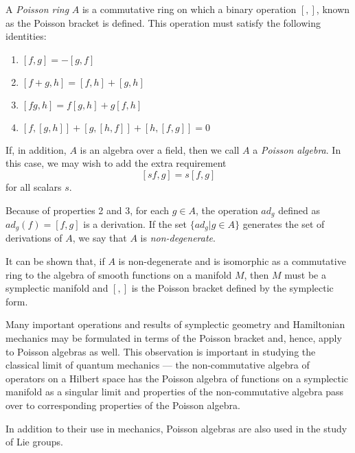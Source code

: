 \documentclass[12pt]{article}
\begin{document}
A \emph{Poisson ring} $A$ is a commutative ring on which a binary operation $[,]$, known as the Poisson bracket is defined.  This operation must satisfy the following identities:
\begin{enumerate}
\item $[f,g] = -[g,f]$
\item $[f + g, h] = [f,h] + [g,h]$
\item $[fg,h] = f[g,h] + g[f,h]$
\item $[f,[g,h]] + [g,[h,f]] + [h,[f,g]] = 0$
\end{enumerate}
If, in addition, $A$ is an algebra over a field, then we call $A$ a \emph{Poisson algebra}.  In this case, we may wish to add the extra requirement
 $$[sf,g] = s[f,g]$$
for all scalars $s$.

Because of properties 2 and 3, for each $g \in A$, the operation $ad_g$ defined as $ad_g(f) = [f,g]$ is a derivation.  If the set $\{ ad_g | g \in A \}$ generates the set of derivations of $A$, we say that  $A$ is \emph{non-degenerate}.

It can be shown that, if $A$ is non-degenerate and is isomorphic as a commutative ring to the algebra of smooth functions on a manifold $M$, then $M$ must be a symplectic manifold and $[,]$ is the Poisson bracket defined by the symplectic form.

Many important operations and results of symplectic geometry and Hamiltonian mechanics may be formulated in terms of the Poisson bracket and, hence, apply to Poisson algebras as well.  This observation is important in studying the classical limit of quantum mechanics --- the non-commutative algebra of operators on a Hilbert space has the Poisson algebra of functions on a symplectic manifold as a singular limit and properties of the non-commutative algebra pass over to corresponding properties of the Poisson algebra.

In addition to their use in mechanics, Poisson algebras are also used in the study of Lie groups.
\end{document}
